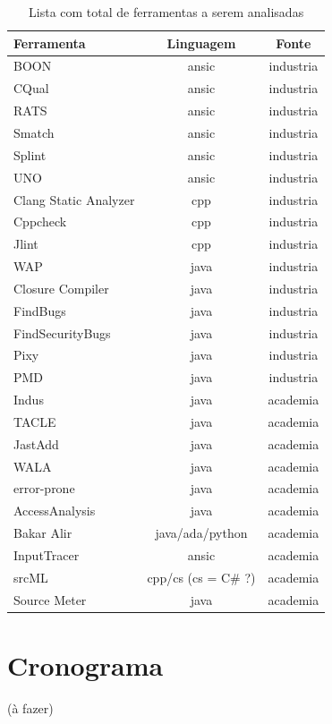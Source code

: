 \documentclass[qual, classic, a4paper]{ufbathesis}
\begin{document}
\begin{table}
\caption{Lista com total de ferramentas a serem analisadas}
\centering
\begin{tabular}{| l | c | c |}
\hline
Ferramenta & Linguagem & Fonte \\
\hline
BOON                  & ansic                & industria \\
CQual                 & ansic                & industria \\
RATS                  & ansic                & industria \\
Smatch                & ansic                & industria \\
Splint                & ansic                & industria \\
UNO                   & ansic                & industria \\
Clang Static Analyzer & cpp                  & industria \\
Cppcheck              & cpp                  & industria \\
Jlint                 & cpp                  & industria \\
WAP                   & java                 & industria \\
Closure Compiler      & java                 & industria \\
FindBugs              & java                 & industria \\
FindSecurityBugs      & java                 & industria \\
Pixy                  & java                 & industria \\
PMD                   & java                 & industria \\
Indus                 & java                 & academia  \\
TACLE                 & java                 & academia  \\
JastAdd               & java                 & academia  \\
WALA                  & java                 & academia  \\
error-prone           & java                 & academia  \\
AccessAnalysis        & java                 & academia  \\
Bakar Alir            & java/ada/python      & academia  \\
InputTracer           & ansic                & academia  \\
srcML                 & cpp/cs (cs = C\# ?)   & academia  \\
Source Meter          & java                 & academia  \\
\hline
\end{tabular}
\label{total-de-ferramentas}
\end{table}

\section{Cronograma}

(à fazer)

\backmatter
\appendix

\end{document}
